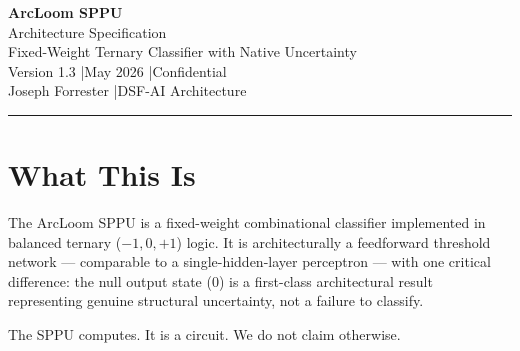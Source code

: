 \documentclass[11pt, a4paper]{article}
\begin{document}
\begin{center}
  {\LARGE \textbf{ArcLoom SPPU}}\\[6pt]
  {\large Architecture Specification}\\[4pt]
  {\large Fixed-Weight Ternary Classifier with Native Uncertainty}\\[8pt]
  {\color{tfe-gray}\small Version 1.3 \quad|\quad May 2026 \quad|\quad Confidential}\\[4pt]
  {\color{tfe-gray}\small Joseph Forrester \quad|\quad DSF-AI Architecture}
\end{center}

\vspace{1em}
\hrule
\vspace{1em}

\section{What This Is}

The ArcLoom SPPU is a fixed-weight combinational classifier
implemented in balanced ternary ($-1, 0, +1$) logic. It is
architecturally a feedforward threshold network --- comparable
to a single-hidden-layer perceptron --- with one critical
difference: the null output state ($0$) is a first-class
architectural result representing genuine structural uncertainty,
not a failure to classify.

The SPPU computes. It is a circuit. We do not claim otherwise.
\end{document}
